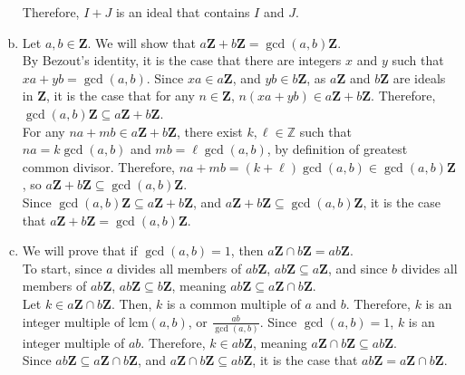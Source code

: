\documentclass[10pt]{extarticle}
\begin{document}
\begin{enumerate}[(a)]
      Therefore, $I+J$ is an ideal that contains $I$ and $J$.
    \item Let $a,b\in\mathbf{Z}$. We will show that $a\mathbf{Z} + b\mathbf{Z} = \gcd(a,b)\mathbf{Z}$.\\

      By Bezout's identity, it is the case that there are integers $x$ and $y$ such that $xa + yb = \gcd(a,b)$. Since $xa\in a\mathbf{Z}$, and $yb\in b\mathbf{Z}$, as $a\mathbf{Z}$ and $b\mathbf{Z}$ are ideals in $\mathbf{Z}$, it is the case that for any $n\in\mathbf{Z}$, $n(xa + yb) \in a\mathbf{Z} + b\mathbf{Z}$. Therefore, $\gcd(a,b)\mathbf{Z}\subseteq a\mathbf{Z} + b\mathbf{Z}$.\\

      For any $na + mb\in a\mathbf{Z} + b\mathbf{Z}$, there exist $k,\ell\in \mathbb{Z}$ such that $na = k\gcd(a,b)$ and $mb = \ell\gcd(a,b)$, by definition of greatest common divisor. Therefore, $na + mb = (k+\ell)\gcd(a,b)\in \gcd(a,b)\mathbf{Z}$, so $a\mathbf{Z}+b\mathbf{Z}\subseteq \gcd(a,b)\mathbf{Z}$.\\

      Since $\gcd(a,b)\mathbf{Z}\subseteq a\mathbf{Z} + b\mathbf{Z}$, and $a\mathbf{Z} + b\mathbf{Z}\subseteq \gcd(a,b)\mathbf{Z}$, it is the case that $a\mathbf{Z} + b\mathbf{Z} = \gcd(a,b)\mathbf{Z}$.
    \item We will prove that if $\gcd(a,b) = 1$, then $a\mathbf{Z}\cap b\mathbf{Z} = ab\mathbf{Z}$.\\

      To start, since $a$ divides all members of $ab\mathbf{Z}$, $ab\mathbf{Z}\subseteq a\mathbf{Z}$, and since $b$ divides all members of $ab\mathbf{Z}$, $ab\mathbf{Z}\subseteq b\mathbf{Z}$, meaning $ab\mathbf{Z}\subseteq a\mathbf{Z}\cap b\mathbf{Z}$.\\

      Let $k\in a\mathbf{Z} \cap b\mathbf{Z}$. Then, $k$ is a common multiple of $a$ and $b$. Therefore, $k$ is an integer multiple of $\text{lcm}(a,b)$, or $\frac{ab}{\gcd(a,b)}$. Since $\gcd(a,b) = 1$, $k$ is an integer multiple of $ab$. Therefore, $k\in ab\mathbf{Z}$, meaning $a\mathbf{Z}\cap b\mathbf{Z}\subseteq ab\mathbf{Z}$.\\

      Since $ab\mathbf{Z}\subseteq a\mathbf{Z}\cap b\mathbf{Z}$, and $a\mathbf{Z}\cap b\mathbf{Z} \subseteq ab\mathbf{Z}$, it is the case that $ab\mathbf{Z} = a\mathbf{Z} \cap b\mathbf{Z}$.
  \end{enumerate}
\end{document}

